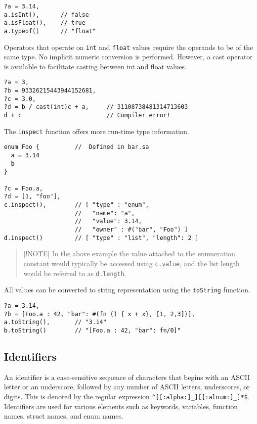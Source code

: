 \begin{verbatim}
?a = 3.14,
a.isInt(),      // false
a.isFloat(),    // true
a.typeof()      // "float"
\end{verbatim}

Operators that operate on \texttt{int} and \texttt{float} values require
the operands to be of the same type. No implicit numeric conversion is
performed. However, a cast operator is available to facilitate casting
between int and float values.

\begin{verbatim}
?a = 3,
?b = 93326215443944152681,
?c = 3.0,
?d = b / cast(int)c + a,     // 31108738481314713603
d + c                        // Compiler error!
\end{verbatim}

The \texttt{inspect} function offers more run-time type information.

\begin{verbatim}
enum Foo {          //  Defined in bar.sa
  a = 3.14
  b
}

?c = Foo.a,
?d = [1, "foo"],
c.inspect(),        // [ "type" : "enum",
                    //   "name": "a",
                    //   "value": 3.14,
                    //   "owner" : #("bar", "Foo") ]
d.inspect()         // [ "type" : "list", "length": 2 ]
\end{verbatim}

\begin{quote}
{[}!NOTE{]} In the above example the value attached to the enumeration
constant would typically be accessed using \texttt{c.value}, and the
list length would be referred to as \texttt{d.length}.
\end{quote}

All values can be converted to string representation using the
\texttt{toString} function.

\begin{verbatim}
?a = 3.14,
?b = [Foo.a : 42, "bar": #(fn () { x + x}, [1, 2,3])],
a.toString(),       // "3.14"
b.toString()        // "[Foo.a : 42, "bar": fn/0]"
\end{verbatim}

\hypertarget{identifiers}{%
\subsection{Identifiers}\label{identifiers}}

An identifier is a case-sensitive sequence of characters that begins
with an ASCII letter or an underscore, followed by any number of ASCII
letters, underscores, or digits. This is denoted by the regular
expression \texttt{\^{}{[}{[}:alpha:{]}\_{]}{[}{[}:alnum:{]}\_{]}*\$}.
Identifiers are used for various elements such as keywords, variables,
function names, struct names, and enum names.

